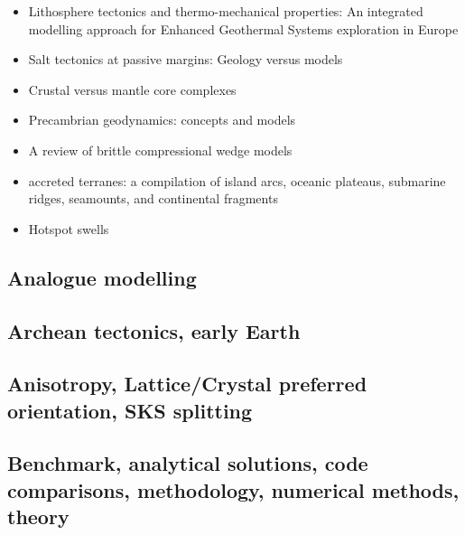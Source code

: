 \begin{itemize}
\item Lithosphere tectonics and thermo-mechanical properties: An integrated modelling
approach for Enhanced Geothermal Systems exploration in Europe \cite{clvz10}
\item Salt tectonics at passive margins: Geology versus models \cite{brfo11}
\item Crustal versus mantle core complexes \cite{brst18}
\item Precambrian geodynamics: concepts and models \cite{gery14}
\item A review of brittle compressional wedge models \cite{buit12}
\item accreted terranes: a compilation of island arcs, oceanic
      plateaus, submarine ridges, seamounts, and continental fragments \cite{tebu14}
\item Hotspot swells \cite{kiad14}
\end{itemize}

\subsection*{Analogue modelling}

\noindent
\cite{nabr93}
\cite{haki01}
\cite{jujb05}
\cite{clbz08}\cite{fufh08}
\cite{pina09}
\cite{casw15}\cite{rods15}\cite{kiff15}
\cite{casw17}
\cite{pirf18}
\cite{mocb19}\cite{sccs19}\cite{muwm19}

\subsection*{Archean tectonics, early Earth}

\noindent
\cite{canc19}\cite{gery19}

\subsection*{Anisotropy, Lattice/Crystal preferred orientation, SKS splitting}

\noindent
\cite{mudm02}
\cite{mumc03}
\cite{mumc04}
\cite{besb06}
\cite{faca13}
\cite{facc14}

\subsection*{Benchmark, analytical solutions, code comparisons, methodology, numerical methods, theory}

